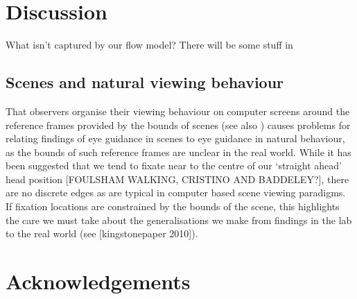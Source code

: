 \documentclass[a4paper, twocolumn, oneside, 10pt]{article}
\begin{document}





\section{Discussion}


What isn't captured by our flow model? There will be some stuff in \cite{macinnes2014}

\subsection{Scenes and natural viewing behaviour}
That observers organise their viewing behaviour on computer screens around the reference frames provided by the bounds of scenes (see also \cite{Stainer:2013ce}) causes problems for relating findings of eye guidance in scenes to eye guidance in natural behaviour, as the bounds of such reference frames are unclear in the real world. While it has been suggested that we tend to fixate near to the centre of our `straight ahead' head position [FOULSHAM WALKING, CRISTINO AND BADDELEY?], there are no discrete edges as are typical in computer based scene viewing paradigms. If fixation locations are constrained by the bounds of the scene, this highlights the care we must take about the generalisations we make from findings in the lab to the real world (see [kingstonepaper 2010]). 


\section*{Acknowledgements}


\appendix



\small

\end{document}
